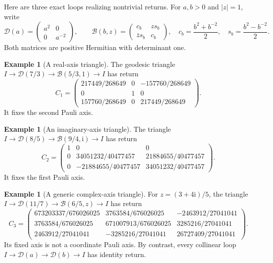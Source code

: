 \documentclass[12pt]{article}
\theoremstyle{definition}
\newtheorem{example}[theorem]{Example}
\theoremstyle{remark}
\newcommand{\ii}{\mathrm i}
\begin{document}
Here are three exact loops realizing nontrivial returns.  For $a,b>0$ and
$|z|=1$, write
\[
 \mathcal D(a)=\begin{pmatrix}a^2&0\\0&a^{-2}\end{pmatrix},\qquad
 \mathcal B(b,z)=\begin{pmatrix}c_b&z s_b\\\bar z s_b&c_b\end{pmatrix},
 \quad
 c_b=\frac{b^2+b^{-2}}2,\quad s_b=\frac{b^2-b^{-2}}2.
\]
Both matrices are positive Hermitian with determinant one.

\begin{example}[A real-axis triangle]\label{ex:holonomy-real}
The geodesic triangle
$I\to\mathcal D(7/3)\to\mathcal B(5/3,1)\to I$ has return
\begin{equation}\label{eq:return-real-axis}
C_1=
\begin{pmatrix}
217449/268649&0&-157760/268649\\
0&1&0\\
157760/268649&0&217449/268649
\end{pmatrix}.
\end{equation}
It fixes the second Pauli axis.
\end{example}

\begin{example}[An imaginary-axis triangle]\label{ex:holonomy-imaginary}
The triangle
$I\to\mathcal D(8/5)\to\mathcal B(9/4,\ii)\to I$ has return
\begin{equation}\label{eq:return-imaginary-axis}
C_2=
\begin{pmatrix}
1&0&0\\
0&34051232/40477457&21884655/40477457\\
0&-21884655/40477457&34051232/40477457
\end{pmatrix}.
\end{equation}
It fixes the first Pauli axis.
\end{example}

\begin{example}[A generic complex-axis triangle]\label{ex:holonomy-generic}
For $z=(3+4\ii)/5$, the triangle
$I\to\mathcal D(11/7)\to\mathcal B(6/5,z)\to I$ has return
\begin{equation}\label{eq:return-generic-axis}
C_3=
\begin{pmatrix}
673203337/676026025&3763584/676026025&-2463912/27041041\\
3763584/676026025&671007913/676026025&3285216/27041041\\
2463912/27041041&-3285216/27041041&26727409/27041041
\end{pmatrix}.
\end{equation}
Its fixed axis is not a coordinate Pauli axis.  By contrast, every collinear
loop $I\to\mathcal D(a)\to\mathcal D(b)\to I$ has identity return.
\end{example}
\end{document}
